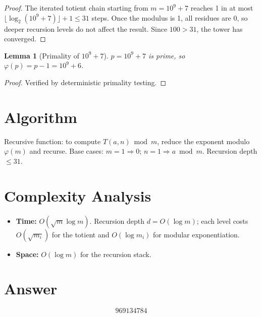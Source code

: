 \documentclass[11pt]{article}
\newtheorem{lemma}[theorem]{Lemma}
\theoremstyle{definition}
\begin{document}
\begin{proof}
The iterated totient chain starting from $m = 10^9 + 7$ reaches 1 in at most $\lfloor \log_2(10^9 + 7) \rfloor + 1 \leq 31$ steps. Once the modulus is 1, all residues are 0, so deeper recursion levels do not affect the result. Since $100 > 31$, the tower has converged.
\end{proof}

\begin{lemma}[Primality of $10^9 + 7$]
$p = 10^9 + 7$ is prime, so $\varphi(p) = p - 1 = 10^9 + 6$.
\end{lemma}

\begin{proof}
Verified by deterministic primality testing.
\end{proof}

\section{Algorithm}

Recursive function: to compute $T(a, n) \bmod m$, reduce the exponent modulo $\varphi(m)$ and recurse. Base cases: $m = 1 \Rightarrow 0$; $n = 1 \Rightarrow a \bmod m$. Recursion depth $\leq 31$.

\section{Complexity Analysis}

\begin{itemize}
\item \textbf{Time:} $O(\sqrt{m} \log m)$. Recursion depth $d = O(\log m)$; each level costs $O(\sqrt{m_i})$ for the totient and $O(\log m_i)$ for modular exponentiation.
\item \textbf{Space:} $O(\log m)$ for the recursion stack.
\end{itemize}

\section{Answer}

\[
\boxed{969134784}
\]
\end{document}
